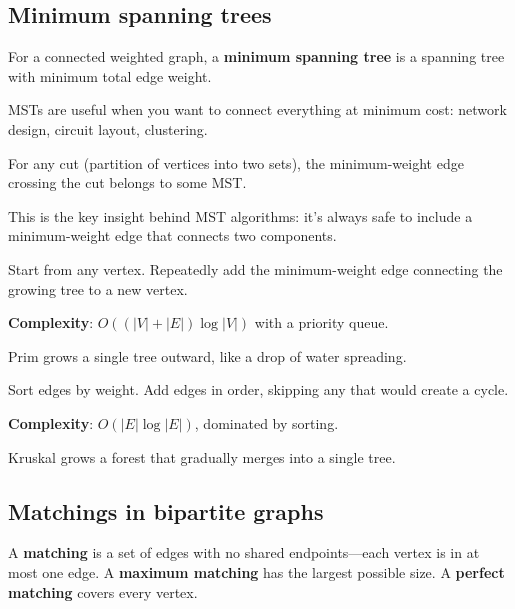 \subsection*{Minimum spanning trees}

\begin{definition}
For a connected weighted graph, a \textbf{minimum spanning tree} is a spanning tree with minimum total edge weight.
\end{definition}

MSTs are useful when you want to connect everything at minimum cost: network design, circuit layout, clustering.

\begin{theorem}
For any cut (partition of vertices into two sets), the minimum-weight edge crossing the cut belongs to some MST.
\end{theorem}

This is the key insight behind MST algorithms: it's always safe to include a minimum-weight edge that connects two components.

\begin{theorem}
Start from any vertex. Repeatedly add the minimum-weight edge connecting the growing tree to a new vertex.

\textbf{Complexity}: $O((|V| + |E|) \log |V|)$ with a priority queue.
\end{theorem}

Prim grows a single tree outward, like a drop of water spreading.

\begin{theorem}
Sort edges by weight. Add edges in order, skipping any that would create a cycle.

\textbf{Complexity}: $O(|E| \log |E|)$, dominated by sorting.
\end{theorem}

Kruskal grows a forest that gradually merges into a single tree.

\subsection*{Matchings in bipartite graphs}

\begin{definition}[Matching]
A \textbf{matching} is a set of edges with no shared endpoints---each vertex is in at most one edge. A \textbf{maximum matching} has the largest possible size. A \textbf{perfect matching} covers every vertex.
\end{definition}

